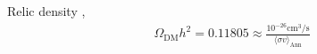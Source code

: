 Relic density \cite{1303.5076}, \cite{1607.02475}
\begin{align}
 \Omega_\text{DM} h^2 = 0.11805 \approx \frac{10^{-26} \text{cm}^3 / \text{s}}{ \langle \sigma v \rangle_\text{Ann}}
\end{align}



